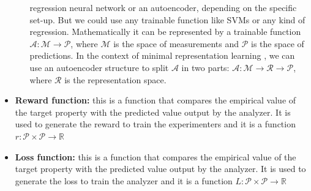 \documentclass[11pt,a4paper,twoside]{report}
\newcommand{\+}{\textnormal{+} }
\theoremstyle{definition}
\numberwithin{equation}{chapter}
\begin{document}
\begin{itemize}
\begin{itemize}
        regression neural network or an autoencoder, depending on the specific
        set-up. But we could use any trainable function like SVMs or any kind of
        regression. Mathematically it can be represented by a trainable function
        $ \mathscr{A} :\mathcal{M} \rightarrow \mathcal{P}$, where $\mathcal{M}$ is the
        space of measurements and $\mathcal{P}$ is the space of predictions. In
        the context of minimal representation learning
        \cite{iten2020discovering}, we can use an autoencoder structure to split
        $\mathscr{A}$ in two parts: $\mathscr{A}:\mathcal{M} \rightarrow \mathcal{R}\rightarrow
        \mathcal{P}$, where $\mathcal{R}$ is the representation space.
  \end{itemize}
    \item \textbf{Reward function:} this is a function that compares the
    empirical value of the target property with the predicted value output by
    the analyzer. It is used to generate the reward to train the
    experimenters and it is a function
    $r:\mathcal{P}\times\mathcal{P}\rightarrow\mathbb{R}$  
    \item \textbf{Loss function:} this is a function that compares the empirical
    value of the target property with the predicted value output by the
    analyzer. It is used to generate the loss to train the analyzer and it is a
    function $L:\mathcal{P}\times\mathcal{P}\rightarrow\mathbb{R}$  
\end{itemize}
\end{document}
